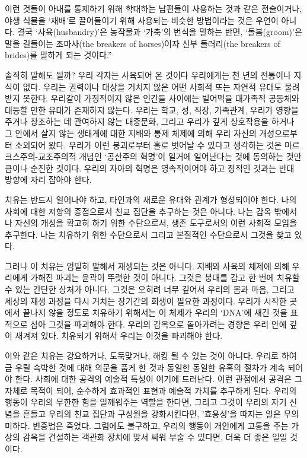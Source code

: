 \documentclass[11pt, b6paper, openany]{memoir}
\begin{document}
\begin{article}
    이런 것들이 아내를 통제하기 위해 학대하는 남편들이 사용하는 것과 같은 전술이거나, 야생 식물을 ‘재배’로 끌어들이기 위해 사용되는 비슷한 방법이라는 것은 우연이 아니다. 결국 ‘사육(husbandry)’은 농작물과 ‘가축’의 번식을 말하는 반면, ‘돌봄(groom)’은 말을 길들이는 조마사(the breakers of horses)이자 신부 들러리(the breakers of brides)를 말하게 되는 것이다.”

솔직히 말해도 될까? 우리 각자는 사육되어 온 것이다 우리에게는 천 년의 전통이나 지식이 없다. 우리는 권력이나 대상을 거치지 않은 어떤 사회적 또는 자연적 유대도 물려받지 못한다. 우리같이 가정적이지 않은 인간들 사이에는 빌어먹을 대가족적 공동체와 대등할 만한 유대가 존재하지 않는다. 우리는 학교, 성, 직장, 가족관계, 우리가 영향을 주거나 창조하는 데 관여하지 않는 대중문화, 그리고 우리가 깊게 상호작용을 하거나 그 안에서 살지 않는 생태계에 대한 지배와 통제 체제에 의해 우리 자신의 개성으로부터 소외되어 왔다. 우리가 이런 붕괴로부터 홀로 벗어날 수 있다고 생각하는 것은 마르크스주의-교조주의적 개념인 ‘공산주의 혁명’이 일거에 일어난다는 것에 동의하는 것만큼이나 순진한 것이다. 우리의 자아의 혁명은 영속적이어야 하고 정적인 것과는 반대 방향에 자리 잡아야 한다. 

치유는 반드시 일어나야 하고, 타인과의 새로운 유대와 관계가 형성되어야 한다. 나의 사회에 대한 저항의 종점으로서 친교 집단을 추구하는 것은 아니다. 나는 감옥 밖에서 나 자신의 개성을 확고히 하기 위한 수단으로서, 생존 도구로서의 이런 사회적 모임을 추구한다. 나는 치유하기 위한 수단으로서 그리고 본질적인 수단으로서 그것을 찾고 있다.

그러나 이 치유는 엄밀히 말해서 재생되는 것은 아니다. 지배와 사육의 체제에 의해 우리에게 가해진 파괴는 윤곽이 뚜렷한 것이 아니다. 그것은 붕대를 감고 한 번에 치유할 수 있는 간단한 상처가 아니다. 그것은 오히려 너무 깊어서 우리의 몸과 마음, 그리고 세상의 재생 과정을 다시 거치는 장기간의 희생이 필요한 과정이다. 우리가 시작한 곳에서 끝나지 않을 정도로 치유하기 위해서는 이 체제가 우리의 ‘DNA’에 새긴 것을 표적으로 삼아 그것을 파괴해야 한다. 우리의 감옥으로 돌아가려는 경향은 우리 안에 깊이 새겨져 있다. 치유되기 위해서 우리는 이것을 파괴해야 한다. 

이와 같은 치유는 강요하거나, 도둑맞거나, 해킹 될 수 있는 것이 아니다. 우리로 하여금 우릴 속박한 것에 대해 의문을 품게 한 것과 동일한 동일한 유혹의 절차가 계속 되어야 한다. 사회에 대한 공격의 예술적 특성이 여기에 드러난다. 이런 관점에서 공격은 그 자체로 목적이 되어, 순수하게 효과적인 표현과 예술적 가치를 추구하게 된다. 우리의 행동이 우리의 무한한 힘을 일깨워주는 역할을 한다면, 그리고 그것이 우리의 자기 신념을 흔들고 우리의 친교 집단과 구성원을 강화시킨다면, '효용성'을 따지는 일은 무의미하다. 변증법은 죽었다. 그럼에도 불구하고, 우리의 행동이 개인에게 고통을 주는 가상의 감옥을 건설하는 객관화 장치에 맞서 싸워 부술 수 있다면, 더욱 더 좋은 일일 것이다. 


\end{article}
\end{document}
